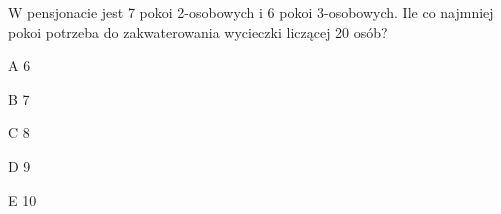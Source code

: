 \begin{tresc}
W pensjonacie jest 7 pokoi 2-osobowych i 6 pokoi 3-osobowych. Ile co najmniej pokoi potrzeba do zakwaterowania wycieczki liczącej 20 osób?
\end{tresc}
\begin{wariant}{A} 6 \end{wariant}
\begin{wariant}{B} 7 \end{wariant}
\begin{wariant}{C} 8 \end{wariant}
\begin{wariant}{D} 9 \end{wariant}
\begin{wariant}{E} 10 \end{wariant}
